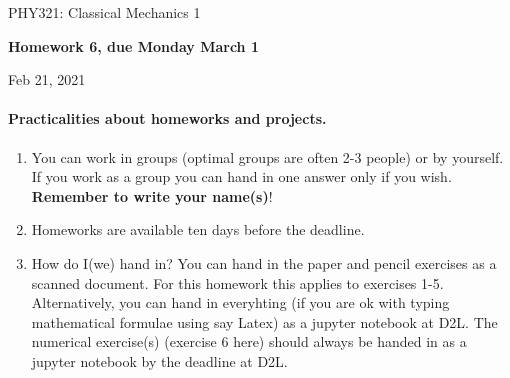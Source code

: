 \documentclass[%
oneside,                 %
final,                   %
10pt]{article}
\begin{document}

\newcommand{\exercisesection}[1]{\subsection*{#1}}






\thispagestyle{empty}

\begin{center}
{\LARGE\bf
\begin{spacing}{1.25}
PHY321: Classical Mechanics 1
\end{spacing}
}
\end{center}


\begin{center}
{\bf Homework 6, due Monday  March 1${}^{}$} \\ [0mm]
\end{center}

\begin{center}
\end{center}
    

\begin{center}
Feb 21, 2021
\end{center}

\vspace{1cm}


\paragraph{Practicalities about  homeworks and projects.}
\begin{enumerate}
\item You can work in groups (optimal groups are often 2-3 people) or by yourself. If you work as a group you can hand in one answer only if you wish. \textbf{Remember to write your name(s)}!

\item Homeworks are available ten days before the deadline.

\item How do I(we)  hand in?  You can hand in the paper and pencil exercises as a scanned document. For this homework this applies to exercises 1-5. Alternatively, you can hand in everyhting (if you are ok with typing mathematical formulae using say Latex) as a jupyter notebook at D2L. The numerical exercise(s) (exercise 6 here) should always be handed in as a jupyter notebook by the deadline at D2L. 
\end{enumerate}
\end{document}
